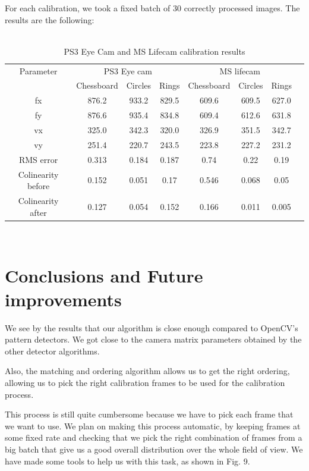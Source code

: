 \documentclass[journal]{IEEEtran}
\begin{document}
For each calibration, we took a fixed batch of 30 correctly processed images. The results are the following:
\\
\\
\begin{table}[h]
\centering 
\begin{tabular}{ |c||c|c|c|c|c|c|c|  }
 \hline
 Parameter & \multicolumn{3}{c|}{PS3 Eye cam} & \multicolumn{3}{c|}{MS lifecam}\\
 \cline{2-7}
 & Chessboard & Circles & Rings & Chessboard & Circles & Rings \\
 \hline
 fx        & 876.2 & 933.2 & 829.5 & 609.6 & 609.5 & 627.0\\
 fy        & 876.6 & 935.4 & 834.8 & 609.4 & 612.6 & 631.8\\
 vx        & 325.0 & 342.3 & 320.0 & 326.9 & 351.5 & 342.7\\
 vy 	       & 251.4 & 220.7 & 243.5 & 223.8 & 227.2 & 231.2\\
 RMS error & 0.313 & 0.184 & 0.187 & 0.74 & 0.22 & 0.19\\
 Colinearity before & 0.152 & 0.051 & 0.17 & 0.546 & 0.068 & 0.05\\
 Colinearity after & 0.127 & 0.054 & 0.152 & 0.166 & 0.011 & 0.005\\
 \hline
\end{tabular}
\\
\caption{PS3 Eye Cam and MS Lifecam calibration results}
\end{table}

\section{Conclusions and Future improvements}
We see by the results that our algorithm is close enough compared to OpenCV's pattern detectors. We got close to the camera matrix parameters obtained by the other detector algorithms.

Also, the matching and ordering algorithm allows us to get the right ordering, allowing us to pick the right calibration frames to be used for the calibration process.

This process is still quite cumbersome because we have to pick each frame that we want to use. We plan on making this process automatic, by keeping frames at some fixed rate and checking that we pick the right combination of frames from a big batch that give us a good overall distribution over the whole field of view. We have made some tools to help us with this task, as shown in Fig. 9.
\end{document}
